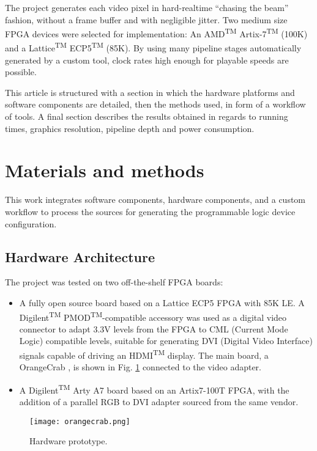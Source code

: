\documentclass[conference]{IEEEtran}
\begin{document}
The project generates each video pixel in hard-realtime “chasing the beam” fashion, without a frame buffer and with negligible jitter. Two medium size FPGA devices were selected for implementation: An  AMD\textsuperscript{TM}  Artix-7\textsuperscript{TM} (100K) and a Lattice\textsuperscript{TM}  ECP5\textsuperscript{TM} (85K). By using many pipeline stages automatically generated by a custom tool, clock rates high enough for playable speeds are possible.

This article is structured with a section in which the hardware platforms and software components are detailed, then the methods used, in form of a workflow of tools. A final section describes the results obtained in regards to running times, graphics resolution, pipeline depth and power consumption.
\\

\section{Materials and methods}
This work integrates software components, hardware components, and a custom workflow to process the sources for generating the programmable logic device configuration.

\subsection{Hardware Architecture}
The project was tested on two off-the-shelf FPGA boards:

\begin{itemize}
\item A fully open source board based on a Lattice ECP5 FPGA with 85K LE. A Digilent\textsuperscript{TM} PMOD\textsuperscript{TM}-compatible accessory was used as a digital video connector to adapt 3.3V levels from the FPGA to CML (Current Mode Logic) compatible levels, suitable for generating DVI (Digital Video Interface) signals capable of driving an HDMI\textsuperscript{TM} display. The main board, a OrangeCrab \cite{orangecrab}, is shown in Fig. \ref{figboard} connected to the video adapter.
\item  A Digilent\textsuperscript{TM}  Arty A7 board based on an Artix7-100T FPGA, with the addition of a parallel RGB to DVI adapter sourced from the same vendor.
\end{itemize}

\begin{figure}
\texttt{[image: orangecrab.png]}
\caption{Hardware prototype.}
\label{figboard}
\end{figure}
\end{document}
